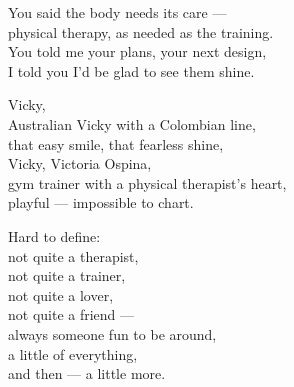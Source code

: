 \begin{lyrics}
You said the body needs its care —\\
physical therapy, as needed as the training.\\
You told me your plans, your next design,\\
I told you I'd be glad to see them shine.

Vicky,\\
Australian Vicky with a Colombian line,\\
that easy smile, that fearless shine,\\
Vicky, Victoria Ospina,\\
gym trainer with a physical therapist's heart,\\
playful — impossible to chart.

Hard to define:\\
not quite a therapist,\\
not quite a trainer,\\
not quite a lover,\\
not quite a friend —\\
always someone fun to be around,\\
a little of everything,\\
and then — a little more.
\end{lyrics}

